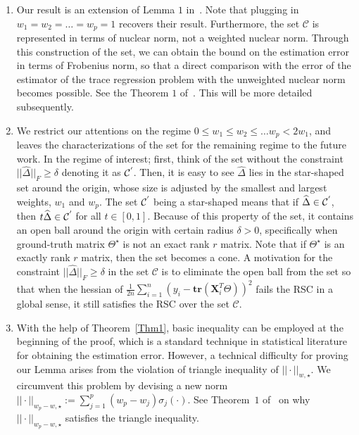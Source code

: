 \documentclass[12pt]{article}
\newcommand*{\myprime}{^{\prime}\mkern-1.2mu}
\begin{document}
\begin{enumerate}
    \item Our result is an extension of Lemma $1$ in~\cite{negahban2011estimation}. 
    Note that plugging in $w_{1}=w_{2}=\dots=w_{p}=1$ recovers their result.
    Furthermore, the set $\mathcal{C}$ is represented in terms of nuclear norm, not a weighted nuclear norm.
    Through this construction of the set, we can obtain the bound on the estimation error in terms of Frobenius norm, 
    so that a direct comparison with the error of the estimator of the trace regression problem with the unweighted nuclear norm becomes possible.
    See the Theorem $1$ of~\cite{negahban2011estimation}. 
    This will be more detailed subsequently.
    
    \item We restrict our attentions on the regime $0\leq w_{1} \leq w_{2} \leq \dots w_{p} < 2w_{1}$, and leaves the characterizations of the set for the remaining regime to the future work.
    In the regime of interest; first, think of the set without the constraint $||\widehat{\Delta}||_{F}\geq \delta$ denoting it as $\mathcal{C^{\myprime}}$.
    Then, it is easy to see $\widehat{\Delta}$ lies in the star-shaped set around the origin, whose size is adjusted by the smallest and largest weights, $w_{1}$ and $w_{p}$.
    The set $\mathcal{C^{\myprime}}$ being a star-shaped means that if $\widehat{\Delta}\in\mathcal{C^{\myprime}}$, then $t\widehat{\Delta}\in\mathcal{C^{\myprime}}$ for all $t\in[0,1]$.
    Because of this property of the set, it contains an open ball around the origin with certain radius $\delta>0$, 
    specifically when ground-truth matrix $\Theta^\star$ is not an exact rank $r$ matrix.
    Note that if $\Theta^{\star}$ is an exactly rank $r$ matrix, then the set becomes a cone.  
    A motivation for the constraint $||\widehat{\Delta}||_{F}\geq\delta$ in the set $\mathcal{C}$ is to eliminate the open ball from the set so that when the hessian of $\frac{1}{2n}\sum^{n}_{i=1} (y_{i} - \textbf{tr}(\mathbf{X}^{T}_{i}\Theta))^2$ fails the RSC in a global sense, it still satisfies the RSC over the set $\mathcal{C}$.

    \item With the help of Theorem~\ref{Thm1}, basic inequality can be employed at the beginning of the proof,
    which is a standard technique in statistical literature for obtaining the estimation error.
    However, a technical difficulty for proving our Lemma arises from the violation of triangle inequality of $|| \cdot ||_{w,\star}$. 
    We circumvent this problem by devising a new norm $|| \cdot ||_{w_{p}-w,\star}:=\sum_{j=1}^{p}(w_{p}-w_{j})\sigma_{j}(\cdot)$. 
    See Theorem~$1$ of~\cite{chen2013reduced} on why $|| \cdot ||_{w_{p}-w,\star}$ satisfies the triangle inequality.
\end{enumerate}
\end{document}
